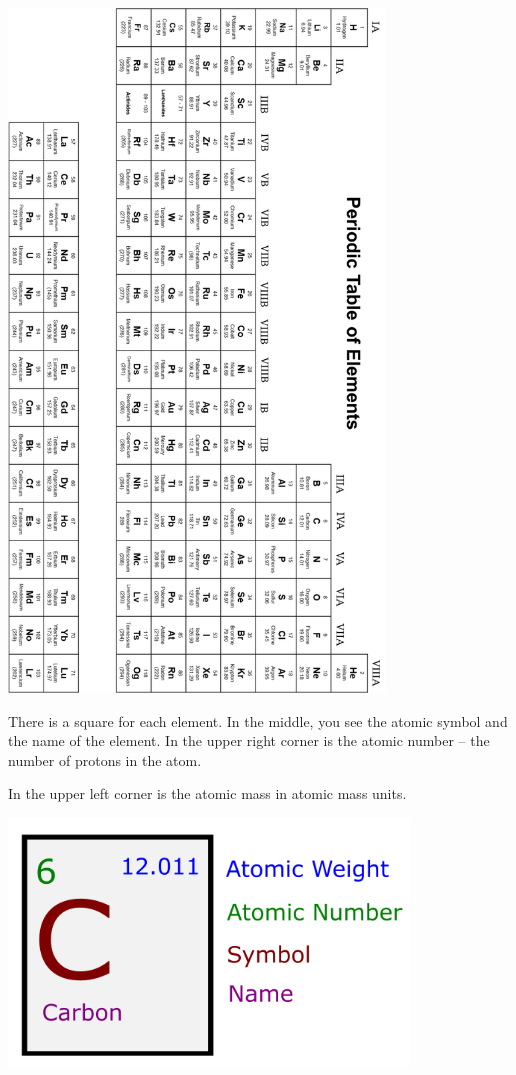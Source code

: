 \includegraphics[width=0.75\textwidth]{periodic.png}


\pagebreak
There is a square for each element. In the middle, you see the atomic
symbol and the name of the element. In the upper right corner is the
atomic number -- the number of protons in the atom.

In the upper left corner is the atomic mass in atomic mass units.

\includegraphics[width=0.8\textwidth]{Atomic_Carbon_Diagram.png}


